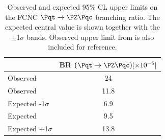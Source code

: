 \begin{table}[htbp]
	\centering
	\begin{tabular}{lc} 
		\toprule
		 								& BR ($\Pqt\rightarrow\PZ\Pqc) [\times 10^{-5}]$  \\
		\midrule
		Observed \cite{TOPQ-2017-06} 	 & 24 \\
		Observed  				   					& 11.8  \\
		Expected -1$\sigma$   				  &   6.9 \\
		Expected                    				&  9.5 \\
	    Expected +1$\sigma$  				 &  13.8 \\		
		\bottomrule
	\end{tabular}
	\caption{
		Observed and expected 95\% CL upper limits on the FCNC $\Pqt\rightarrow\PZ\Pqc$ branching ratio. 
		The expected central value is shown together with the $\pm$1$\sigma$ bands.
		Observed upper limit from \cite{TOPQ-2017-06} is also included for reference.
	}%
	\label{tab:results:limits}
\end{table}

